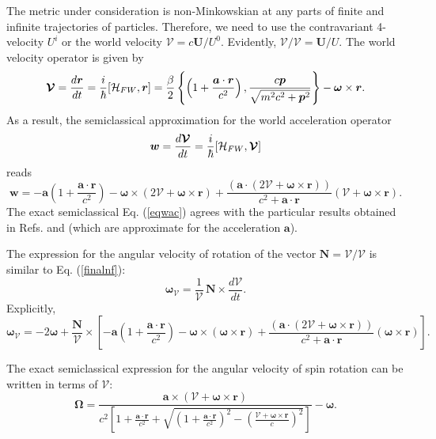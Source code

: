\documentclass[preprint,showpacs,preprintnumbers,eqsecnum,amsmath,amssymb]{revtex4}
\begin{document}
The metric under consideration is non-Minkowskian at any parts of
finite and infinite trajectories of particles. Therefore, we need
to use the contravariant 4-velocity $U^i$ or the world velocity
$\bm{\mathcal{V}}=c\bm{U}/U^0$. Evidently,
$\bm{\mathcal{V}}/\mathcal{V}=\bm{U}/U$.
%
The world velocity operator is given by
\begin{equation}
\bm{\mathcal{V}}=\frac{d\bm r}{dt}=\frac{i}{\hbar}[{\cal
H}_{FW},\bm r]= \frac\beta2\left\{\left(1+\frac{\bm a\cdot\bm
r}{c^2}\right), \frac{c\bm p}{\sqrt{m^2c^2+\bm
p^2}}\right\}-\bm\omega\times\bm r. \label{eqwve}
\end{equation}
As a result, the semiclassical approximation for the world
acceleration operator
$$\bm w=\frac{d\bm{\mathcal{V}}}{dt}=\frac{i}{\hbar}[{\cal H}_{FW},
\bm{\mathcal{V}}]$$ reads
\begin{equation}
\bm{w}=-\bm a\left(1+\frac{\bm a\cdot\bm
r}{c^2}\right)-\bm\omega\times(2\bm{\mathcal{V}}
+\bm\omega\times\bm r)+\frac{(\bm a\cdot(2\bm{\mathcal{V}}
+\bm\omega\times\bm r))}{c^2+\bm a\cdot\bm
r}\left(\bm{\mathcal{V}} +\bm\omega\times\bm r\right).\label{eqwac}
\end{equation}
The exact semiclassical Eq. (\ref{eqwac}) agrees with the particular results 
obtained in Refs. \cite{PRD} and \cite{PRD2} (which are approximate for the
acceleration $\bm a$).

The expression for the angular velocity of rotation of the vector
$\bm N=\bm{\mathcal{V}}/\mathcal{V}$ is similar to Eq. (\ref{finalnf}):
\begin{equation}
\bm\omega_{\mathcal{V}} = {\frac {1}{{\mathcal{V}}}}\,{\bm
N}\times \frac{d{\bm{\mathcal{V}}}}{dt}.\label{finalmv}
\end{equation}
Explicitly,
\begin{equation}
\bm\omega_{\mathcal{V}} = -2\bm\omega+{\frac {\bm
N}{{\mathcal{V}}}}\times\left[ -\bm a\left(1+\frac{\bm a\cdot\bm
r}{c^2}\right)-\bm\omega\times(\bm\omega\times\bm r)+ \frac{(\bm
a\cdot(2\bm{\mathcal{V}} +\bm\omega\times\bm r))}{c^2+\bm
a\cdot\bm r}\left(\bm\omega\times\bm r\right)\right].\label{finaN}
\end{equation}

The exact semiclassical expression for the angular velocity of spin
rotation can be written in terms of $\bm{\mathcal{V}}$:
\begin{equation}
\bm\Omega=\frac{\bm a\times(\bm{\mathcal{V}}+\bm\omega\times\bm r)}{c^2 
\left[1+\frac{\bm a\cdot\bm r}{c^2}+\sqrt{\left(1+\frac{\bm a\cdot\bm
r}{c^2}\right)^2-\left(\frac{\bm{\mathcal{V}}+ \bm\omega\times\bm
r}{c}\right)^2}\right]}-\bm\omega.\label{HamlOme}
\end{equation}
\end{document}
